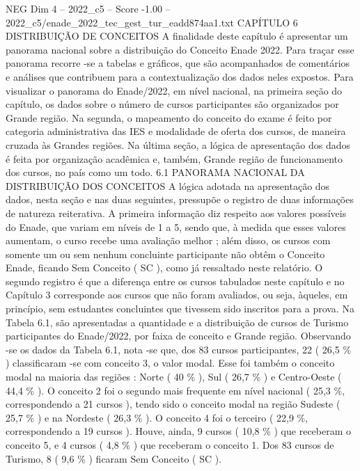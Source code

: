 \begin{textsample}{NEG Dim 4 – 2022\_c5 – Score -1.00 – 2022\_c5/enade\_2022\_tec\_gest\_tur\_eadd874aa1.txt}  \label{ex:f4_neg_080}
CAPÍTULO 6 DISTRIBUIÇÃO DE CONCEITOS A finalidade deste capítulo é apresentar um panorama nacional sobre a distribuição do Conceito Enade 2022.
Para traçar esse panorama recorre -se a tabelas e gráficos, que são acompanhados de comentários e análises que contribuem para a contextualização dos dados neles expostos.
Para visualizar o panorama do Enade/2022, em nível nacional, na primeira seção do capítulo, os dados sobre o número de cursos participantes são organizados por Grande região.
Na segunda, o mapeamento do conceito do exame é feito por categoria administrativa das IES e modalidade de oferta dos cursos, de maneira cruzada às Grandes regiões.
Na última seção, a lógica de apresentação dos dados é feita por organização acadêmica e, também, Grande região de funcionamento dos cursos, no país como um todo. 6.1 PANORAMA NACIONAL DA DISTRIBUIÇÃO DOS CONCEITOS A lógica adotada na apresentação dos dados, nesta seção e nas duas seguintes, pressupõe o registro de duas informações de natureza reiterativa.
A primeira informação diz respeito aos valores possíveis do Enade, que variam em níveis de 1 a 5, sendo que, à medida que esses valores aumentam, o curso recebe uma avaliação melhor ; além disso, os cursos com somente um ou sem nenhum concluinte participante não obtêm o Conceito Enade, ficando Sem Conceito ( SC ), como já ressaltado neste relatório.
O segundo registro é que a diferença entre os cursos tabulados neste capítulo e no Capítulo 3 corresponde aos cursos que não foram avaliados, ou seja, àqueles, em princípio, sem estudantes concluintes que tivessem sido inscritos para a prova.
Na Tabela 6.1, são apresentadas a quantidade e a distribuição de cursos de Turismo participantes do Enade/2022, por faixa de conceito e Grande região.
Observando -se os dados da Tabela 6.1, nota -se que, dos 83 cursos participantes, 22 ( 26,5 \% ) classificaram -se com conceito 3, o valor modal.
Esse foi também o conceito modal na maioria das regiões : Norte ( 40 \% ), Sul ( 26,7 \% ) e Centro-Oeste ( 44,4 \% ).
O conceito 2 foi o segundo mais frequente em nível nacional ( 25,3 \%, correspondendo a 21 cursos ), tendo sido o conceito modal na região Sudeste ( 25,7 \% ) e na Nordeste ( 26,3 \% ).
O conceito 4 foi o terceiro ( 22,9 \%, correspondendo a 19 cursos ).
Houve, ainda, 9 cursos ( 10,8 \% ) que receberam o conceito 5, e 4 cursos ( 4,8 \% ) que receberam o conceito 1.
Dos 83 cursos de Turismo, 8 ( 9,6 \% ) ficaram Sem Conceito ( SC ).

\end{textsample}
